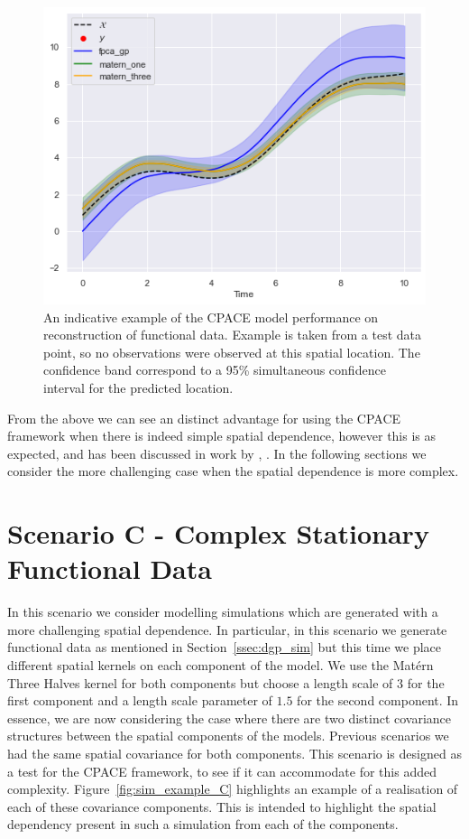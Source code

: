 \begin{figure}
	\centering
	\includegraphics[width=\textwidth]{test_ex_B}
	\caption{An indicative example of the CPACE model performance on reconstruction of functional data. Example is taken from a test data point, so no observations were observed at this spatial location. The confidence band correspond to a 95\% simultaneous confidence interval for the predicted location.}
	\label{fig:test_ex_B}
\end{figure}


From the above we can see an distinct advantage for using the CPACE framework when there is indeed simple spatial dependence, however this is as expected, and has been discussed in work by \citeauthor{liu_functional_2017}, \citep{liu_functional_2017}.
In the following sections we consider the more challenging case when the spatial dependence is more complex.

\section{Scenario C - Complex Stationary Functional Data \label{sec:sim_C}}

In this scenario we consider modelling simulations which are generated with a more challenging spatial dependence.
In particular, in this scenario we generate functional data as mentioned in Section~\ref{ssec:dgp_sim} but this time we place different spatial kernels on each component of the model.
We use the Mat\'ern Three Halves kernel for both components but choose a length scale of $3$ for the first component and a length scale parameter of $1.5$ for the second component.
In essence, we are now considering the case where there are two distinct covariance structures between the spatial components of the models.
Previous scenarios we had the same spatial covariance for both components.
This scenario is designed as a test for the CPACE framework, to see if it can accommodate for this added complexity.
Figure~\ref{fig:sim_example_C} highlights an example of a realisation of each of these covariance components. 
This is intended to highlight the spatial dependency present in such a simulation from each of the components.

